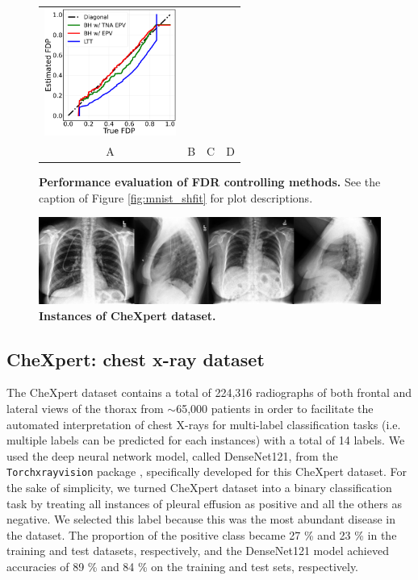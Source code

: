 \documentclass{article}
\begin{document}
\begin{figure}[h!]
\begin{tabular}{cccc}
		\includegraphics[width=1.7in]{img/cnn_FDPscat_chx_balanced.png}\\
		A & B & C & D
	\end{tabular}
	\caption{{\bf Performance evaluation of FDR controlling methods.} See the caption of Figure \ref{fig:mnist_shfit} for plot descriptions. }
	\label{fig:I}
\end{figure} 

\begin{figure}[h!]
	\centering
	\includegraphics[width=5.in]{img/chx.png}
	\caption{{\bf Instances of CheXpert dataset.}}
	\label{fig:pcam_example}
\end{figure} 

\subsection{CheXpert: chest x-ray dataset}

The CheXpert dataset contains a total of 224,316 radiographs of both frontal and lateral views of the thorax from $\sim$65,000 patients in order to facilitate the automated interpretation of chest X-rays for multi-label classification tasks (i.e. multiple labels can be predicted for each instances) with a total of 14 labels. We used the deep neural network model, called DenseNet121, from the \texttt{Torchxrayvision} package \cite{cohen2020limits,Cohen2022xrv}, specifically developed for this CheXpert dataset. For the sake of simplicity, we turned CheXpert dataset into a binary classification task by treating all instances of pleural effusion as positive and all the others as negative. We selected this label because this was the most abundant disease in the dataset. The proportion of the positive class became 27 \% and 23 \% in the training and test datasets, respectively, and the DenseNet121 model achieved accuracies of 89 \% and 84 \% on the training and test sets, respectively.
\end{document}

